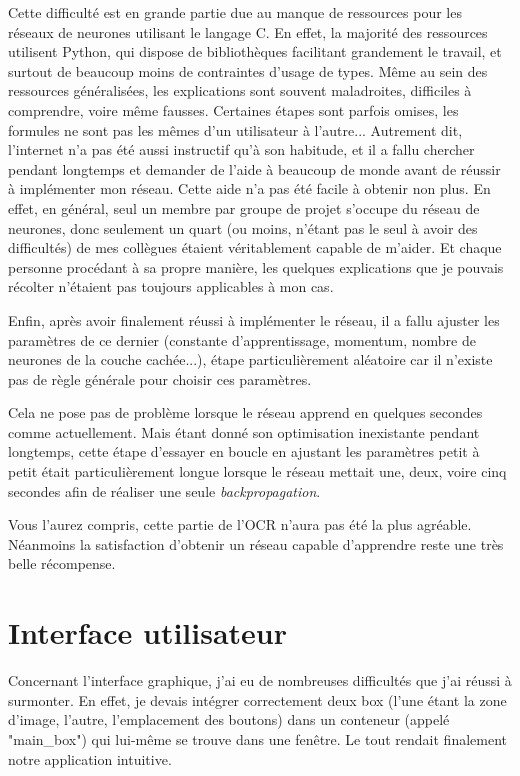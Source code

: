 \documentclass[12pt]{report}
\begin{document}
Cette difficulté est en grande partie due au manque de ressources pour les réseaux de neurones utilisant le langage C. En effet, la majorité des ressources utilisent Python, qui dispose de bibliothèques facilitant grandement le travail, et surtout de beaucoup moins de contraintes d'usage de types. Même au sein des ressources généralisées, les explications sont souvent maladroites, difficiles à comprendre, voire même fausses. Certaines étapes sont parfois omises, les formules ne sont pas les mêmes d'un utilisateur à l'autre... Autrement dit, l'internet n'a pas été aussi instructif qu'à son habitude, et il a fallu chercher pendant longtemps et demander de l'aide à beaucoup de monde avant de réussir à implémenter mon réseau. Cette aide n'a pas été facile à obtenir non plus. En effet, en général, seul un membre par groupe de projet s'occupe du réseau de neurones, donc seulement un quart (ou moins, n'étant pas le seul à avoir des difficultés) de mes collègues étaient véritablement capable de m'aider. Et chaque personne procédant à sa propre manière, les quelques explications que je pouvais récolter n'étaient pas toujours applicables à mon cas.

Enfin, après avoir finalement réussi à implémenter le réseau, il a fallu ajuster les paramètres de ce dernier (constante d'apprentissage, momentum, nombre de neurones de la couche cachée...), étape particulièrement aléatoire car il n'existe pas de règle générale pour choisir ces paramètres. 

\newpage

Cela ne pose pas de problème lorsque le réseau apprend en quelques secondes comme actuellement. Mais étant donné son optimisation inexistante pendant longtemps, cette étape d'essayer en boucle en ajustant les paramètres petit à petit était particulièrement longue lorsque le réseau mettait une, deux, voire cinq secondes afin de réaliser une seule \textit{backpropagation}.

Vous l'aurez compris, cette partie de l'OCR n'aura pas été la plus agréable. Néanmoins la satisfaction d'obtenir un réseau capable d'apprendre reste une très belle récompense.

\section*{Interface utilisateur}

Concernant l’interface graphique, j’ai eu de nombreuses difficultés que j’ai réussi à surmonter. 
En effet, je devais intégrer correctement deux box (l’une étant la zone d’image, l’autre, l’emplacement des boutons) dans un conteneur (appelé "main\_box") qui lui-même se trouve dans une fenêtre. Le tout rendait finalement notre application intuitive.
\end{document}
